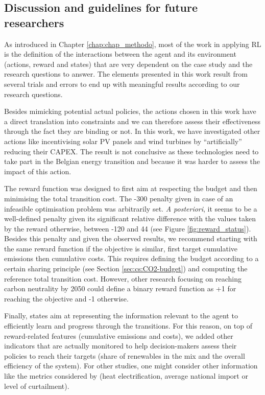 \subsection{Discussion and guidelines for future researchers}
\label{subsec:RL:act_states_rew:discussion}
As introduced in Chapter \ref{chap:chap_methodo}, most of the work in applying \gls{RL} is the definition of the interactions between the agent and its environment (\ie actions, reward and states) that are very dependent on the case study and the research questions to answer. The elements presented in this work result from several trials and errors to end up with meaningful results according to our research questions.

Besides mimicking potential actual policies, the actions chosen in this work have a direct translation into constraints and we can therefore assess their effectiveness through the fact they are binding or not. In this work, we have investigated other actions like incentivising solar \gls{PV} panels and wind turbines by ``artificially'' reducing their \gls{CAPEX}. The result is not conclusive as these technologies need to take part in the Belgian energy transition and because it was harder to assess the impact of this action. 

The reward function was designed to first aim at respecting the  budget and then minimising the total transition cost. The -300 penalty given in case of an infeasible optimisation problem was arbitrarily set. \textit{A posteriori}, it seems to be a well-defined penalty given its significant relative difference with the values taken by the reward otherwise, between -120 and 44 (see Figure \ref{fig:reward_status}). Besides this penalty and given the observed results, we recommend starting with the same reward function if the objective is similar, first target cumulative emissions then cumulative costs. This requires defining the  budget according to a certain sharing principle (see Section \ref{sec:cs:CO2-budget}) and computing the reference total transition cost. However, other research focusing on reaching carbon neutrality by 2050 could define a binary reward function as +1 for reaching the objective and -1 otherwise.

Finally, states aim at representing the information relevant to the agent to efficiently learn and progress through the transitions. For this reason, on top of reward-related features (cumulative emissions and costs), we added other indicators that are actually monitored to help decision-makers assess their policies to reach their targets (share of renewables in the mix and the overall efficiency of the system). For other studies, one might consider other information like the metrics considered by \citet{pickering2022diversity} (\eg heat electrification, average national import or level of curtailment).

